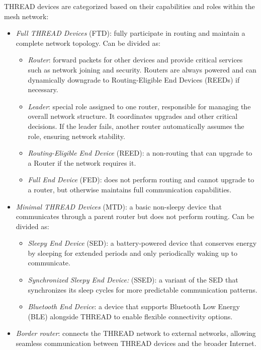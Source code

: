 THREAD devices are categorized based on their capabilities and roles within the mesh network:
\begin{itemize}
    \item \textit{Full THREAD Devices} (FTD): fully participate in routing and maintain a complete network topology.
        Can be divided as: 
        \begin{itemize}
            \item \textit{Router}: forward packets for other devices and provide critical services such as network joining and security.
                Routers are always powered and can dynamically downgrade to Routing-Eligible End Devices (REEDs) if necessary.
            \item \textit{Leader}: special role assigned to one router, responsible for managing the overall network structure. 
                It coordinates upgrades and other critical decisions. 
                If the leader fails, another router automatically assumes the role, ensuring network stability.
            \item \textit{Routing-Eligible End Device} (REED): a non-routing that can upgrade to a Router if the network requires it.
            \item \textit{Full End Device} (FED): does not perform routing and cannot upgrade to a router, but otherwise maintains full communication capabilities.
        \end{itemize}
    \item \textit{Minimal THREAD Devices} (MTD): a basic non-sleepy device that communicates through a parent router but does not perform routing.
        Can be divided as: 
        \begin{itemize}
            \item \textit{Sleepy End Device} (SED): a battery-powered device that conserves energy by sleeping for extended periods and only periodically waking up to communicate.
            \item \textit{Synchronized Sleepy End Device:} (SSED): a variant of the SED that synchronizes its sleep cycles for more predictable communication patterns.
            \item \textit{Bluetooth End Device}: a device that supports Bluetooth Low Energy (BLE) alongside THREAD to enable flexible connectivity options.
        \end{itemize}
    \item \textit{Border router}: connects the THREAD network to external networks, allowing seamless communication between THREAD devices and the broader Internet. 
\end{itemize}


